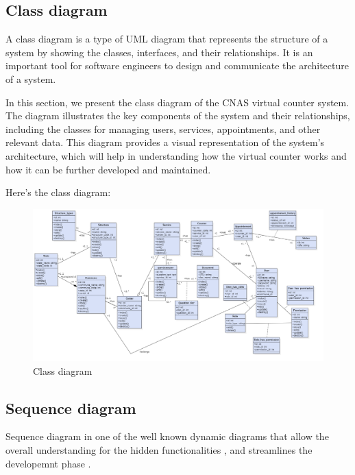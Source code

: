 \subsection{Class diagram}
A class diagram is a type of UML diagram that represents the structure of a system by showing the classes, interfaces, and their relationships. It is an important tool for software engineers to design and communicate the architecture of a system. 

\medskip In this section, we present the class diagram of the CNAS virtual counter system. The diagram illustrates the key components of the system and their relationships, including the classes for managing users, services, appointments, and other relevant data. This diagram provides a visual representation of the system's architecture, which will help in understanding how the virtual counter works and how it can be further developed and maintained.

\bigskip Here's the class diagram:
\begin{figure}[H]
    \centering
    \includegraphics[width=1.0\textwidth]{ClassDiagram.png}
    \caption{Class diagram}
    \label{classdiagram}
\end{figure}
\newpage
\subsection{Sequence diagram}
Sequence diagram in one of the well known dynamic diagrams that allow the overall understanding for the hidden functionalities , and streamlines the developemnt phase . 

